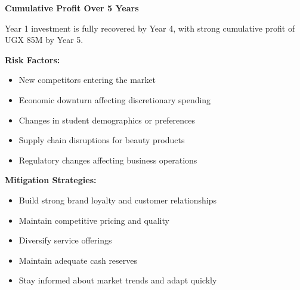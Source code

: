 \begin{center}
\textbf{Cumulative Profit Over 5 Years}
\vspace{0.5em}


\vspace{0.5em}
Year 1 investment is fully recovered by Year 4, with strong cumulative profit of UGX 85M by Year 5.
\end{center}

\textbf{Risk Factors:}
\begin{itemize}[leftmargin=2em]
    \item New competitors entering the market
    \item Economic downturn affecting discretionary spending
    \item Changes in student demographics or preferences
    \item Supply chain disruptions for beauty products
    \item Regulatory changes affecting business operations
\end{itemize}

\textbf{Mitigation Strategies:}
\begin{itemize}[leftmargin=2em]
    \item Build strong brand loyalty and customer relationships
    \item Maintain competitive pricing and quality
    \item Diversify service offerings
    \item Maintain adequate cash reserves
    \item Stay informed about market trends and adapt quickly
\end{itemize}

